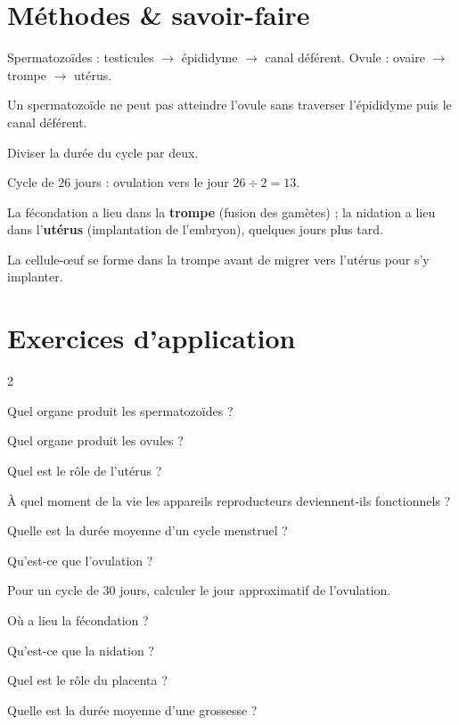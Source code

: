 \section{Méthodes \& savoir-faire}

Spermatozoïdes : testicules $\to$ épididyme $\to$ canal déférent. Ovule : ovaire $\to$
trompe $\to$ utérus.
\begin{exemple}
Un spermatozoïde ne peut pas atteindre l'ovule sans traverser l'épididyme puis le canal
déférent.
\end{exemple}

Diviser la durée du cycle par deux.
\begin{exemple}
Cycle de $26$ jours : ovulation vers le jour $26\div2=13$.
\end{exemple}

La fécondation a lieu dans la \textbf{trompe} (fusion des gamètes) ; la nidation a lieu
dans l'\textbf{utérus} (implantation de l'embryon), quelques jours plus tard.
\begin{exemple}
La cellule-œuf se forme dans la trompe avant de migrer vers l'utérus pour s'y implanter.
\end{exemple}

\section{Exercices d'application}
\begin{multicols}{2}

\exo{} Quel organe produit les spermatozoïdes ?

\exo{} Quel organe produit les ovules ?

\exo{} Quel est le rôle de l'utérus ?

\exo{} À quel moment de la vie les appareils reproducteurs deviennent-ils
fonctionnels ?

\exo{} Quelle est la durée moyenne d'un cycle menstruel ?

\exo{} Qu'est-ce que l'ovulation ?

\exo{} Pour un cycle de $30$ jours, calculer le jour approximatif de
l'ovulation.

\exo{} Où a lieu la fécondation ?

\exo{} Qu'est-ce que la nidation ?

\exo{} Quel est le rôle du placenta ?

\exo{} Quelle est la durée moyenne d'une grossesse ?

\end{multicols}


